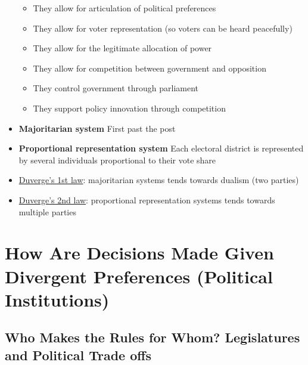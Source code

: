 \documentclass[11pt]{article}
\begin{document}
\begin{itemize}
\begin{itemize}
\item They allow for articulation of political preferences
\item They allow for voter representation (so voters can be heard peacefully)
\item They allow for the legitimate allocation of power
\item They allow for competition between government and opposition
\item They control government through parliament
\item They support policy innovation through competition
\end{itemize}
\item \textbf{Majoritarian system} First past the post
\item \textbf{Proportional representation system} Each electoral district is represented
by several individuals proportional to their vote share
\item \href{20200716210455-duverge\_s\_1st\_law.org}{Duverge's 1st law}: majoritarian systems tends towards dualism (two parties)
\item \href{20200716210532-duverge\_s\_2nd\_law.org}{Duverge's 2nd law}: proportional representation systems tends towards multiple parties
\end{itemize}

\section{How Are Decisions Made Given Divergent Preferences (Political Institutions)}
\label{sec:org53781d0}
\subsection{Who Makes the Rules for Whom?  Legislatures and Political Trade offs}
\label{sec:org6b660b9}
\end{document}
